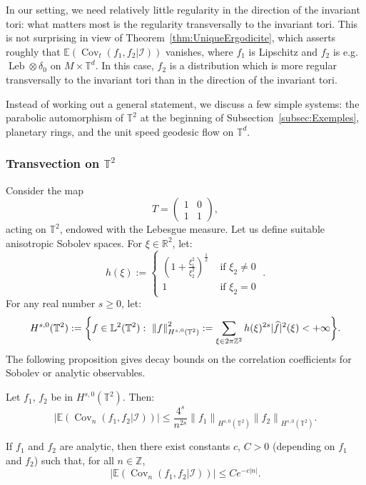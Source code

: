 \documentclass[AHL,Unicode,longabstracts]{cedram}
\DeclareMathOperator{\Cov}{Cov}
\DeclareMathOperator{\Leb}{Leb}
\newcommand{\Z}{\mathbb{Z}}
\newcommand{\R}{\mathbb{R}}
\newcommand{\Ebb}{\mathbb{E}}
\newcommand{\Lbb}{\mathbb{L}}
\newcommand{\Tbb}{\mathbb{T}}
\newcommand{\Ical}{\mathcal{I}}
\newcommand{\norm}[2]{\left\| #1 \right\|_{#2}}
\renewcommand*{\hat}[1]{\mathchoice{\widehat{#1}}{\widehat{#1}}{\oldhat{#1}}{\oldhat{#1}}}\let\oldforall\forall
\renewcommand*{\forall}{\mathrel{\oldforall}}
\begin{document}

In our setting, we need relatively little regularity in the direction of the invariant tori: what matters most is the regularity transversally to the invariant tori. This is not surprising in view of Theorem~\ref{thm:UniqueErgodicite}, which asserts roughly that $\Ebb (\Cov_t (f_1, f_2|\Ical))$ vanishes, where $f_1$ is Lipschitz and $f_2$ is e.g. $\Leb \otimes \delta_0$ on $M \times \Tbb^d$. In this case, $f_2$ is a distribution which is more regular transversally to the invariant tori than in the direction of the invariant tori.


Instead of working out a general statement, we discuss a few simple systems: the parabolic automorphism of $\Tbb^2$ at the beginning of Subsection~\ref{subsec:Exemples}, planetary rings, and the unit speed geodesic flow on $\Tbb^d$.


\subsubsection{Transvection on \texorpdfstring{$\Tbb^2$}{Tbb2}}\label{subsubsec:VitesseTransvection}

Consider the map
\begin{equation}\label{eq:DefinitionTransvection}
T =
\begin{pmatrix}
1 & 0 \\
1 & 1
\end{pmatrix},
\end{equation}
acting on $\Tbb^2$, endowed with the Lebesgue measure. Let us define suitable anisotropic Sobolev spaces. For $\xi \in \R^2$, let:
\[
h (\xi) :=
\begin{cases}
\left(1+\frac{\xi_1^2}{\xi_2^2} \right)^{\frac{1}{2}} & \text{ if } \xi_2 \neq 0 \\
1 & \text{ if } \xi_2 = 0
\end{cases}\;.
\]
For any real number $s \geq 0$, let:
\[
H^{s,0} (\Tbb^2) := \bigg\{ f \in \Lbb^2 (\Tbb^2): \ \norm{f}{H^{s,0} (\Tbb^2)}^2 := \sum_{\xi \in 2\pi\Z^2} h(\xi)^{2s} |\hat{f}|^2 (\xi) <+\infty \bigg\}.
\]
The following proposition gives decay bounds on the correlation coefficients for Sobolev or analytic observables.


\begin{prop}\label{prop:VitesseTransvection}

Let $f_1$, $f_2$ be in $H^{s,0} (\Tbb^2)$. Then:
\[
\big| \Ebb (\Cov_n (f_1, f_2|\Ical)) \big|
\leq \frac{4^s}{n^{2s}} \norm{f_1}{H^{s,0} (\Tbb^2)} \norm{f_2}{H^{s,0} (\Tbb^2)}.
\]

If $f_1$ and $f_2$ are analytic, then there exist constants $c$, $C>0$ (depending on $f_1$ and $f_2$) such that, for all $n \in \Z$,
\[
\big| \Ebb (\Cov_n (f_1, f_2|\Ical)) \big|
\leq C e^{-c|n|}.
\]
\end{prop}
\end{document}
